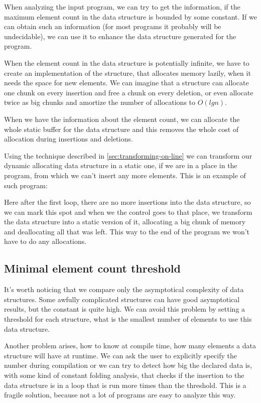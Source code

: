 \documentclass[11pt]{article}
\begin{document}
		When analyzing the input program, we can try to get the information, if the maximum element count in the
		data structure is bounded by some constant. If we can obtain such an information (for most programs it
		probably will be undecidable), we can use it to enhance the data structure generated for the program.

		When the element count in the data structure is potentially infinite, we have to create an
		implementation of the structure, that allocates memory lazily, when it needs the space for new elements.
		We can imagine that a structure can allocate one chunk on every insertion and free a chunk on every
		deletion, or even allocate twice as big chunks and amortize the number of allocations to $O(lg n)$.

		When we have the information about the element count, we can allocate the whole static buffer for the
		data structure and this removes the whole cost of allocation during insertions and deletions.

		Using the technique described in \autoref{sec:transforming-on-line} we can transform our dynamic
		allocating data structure in a static one, if we are in a place in the program, from which we can't
		insert any more elements. This is an example of such program:

		

		Here after the first loop, there are no more insertions into the data structure, so we can mark this
		spot and when we the control goes to that place, we transform the data structure into a static version
		of it, allocating a big chunk of memory and deallocating all that was left. This way to the end of the
		program we won't have to do any allocations.

	\subsection{Minimal element count threshold}

		It's worth noticing that we compare only the asymptotical complexity of data structures. Some awfully
		complicated structures can have good asymptotical results, but the constant is quite high. We can avoid
		this problem by setting a threshold for each structure, what is the smallest number of elements to use
		this data structure.

		Another problem arises, how to know at compile time, how many elements a data structure will have at
		runtime. We can ask the user to explicitly specify the number during compilation or we can try to
		detect how big the declared data is, with some kind of constant folding analysis, that checks if the
		insertion to the data structure is in a loop that is run more times than the threshold. This is a fragile
		solution, because not a lot of programs are easy to analyze this way.
\end{document}
